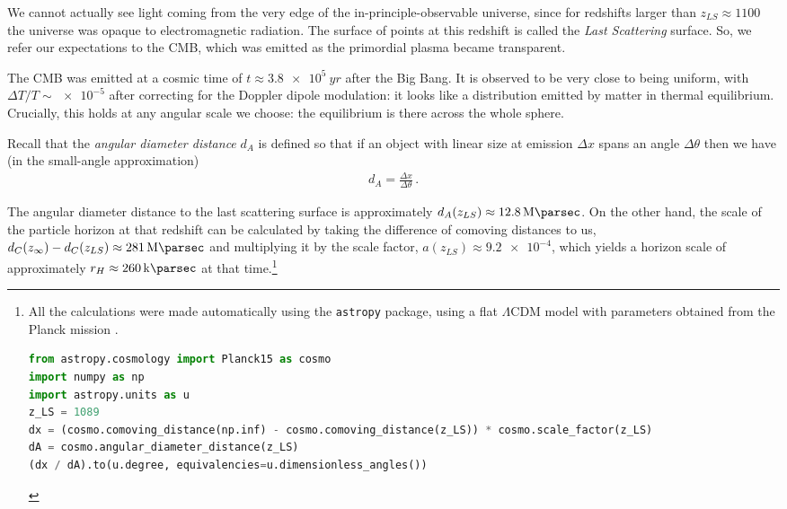 \documentclass[main.tex]{subfiles}
\begin{document}
We cannot actually see light coming from the very edge of the in-principle-observable universe, since for redshifts larger than \(z _{LS} \approx 1100\) the universe was opaque to electromagnetic radiation. The surface of points at this redshift is called the \emph{Last Scattering} surface. So, we refer our expectations to the CMB, which was emitted as the primordial plasma became transparent. 






The CMB was emitted at a cosmic time of \(t \approx \SI{3.8e5}{yr}\) after the Big Bang.
It is observed to be very close to being uniform, with \(\Delta T / T \sim \num{e-5}\) after correcting for the Doppler dipole modulation: 
it looks like a distribution emitted by matter in thermal equilibrium.
Crucially, this holds at any angular scale we choose: the equilibrium is there across the whole sphere.

Recall that the \emph{angular diameter distance} \(d_A\) is defined so that if an object with linear size at emission \(\Delta x\) spans an angle \(\Delta \theta \) then we have (in the small-angle approximation) 
%
\begin{align}
d_A = \frac{\Delta x}{\Delta \theta }
\,.
\end{align}

The angular diameter distance to the last scattering surface  is approximately \(d_A (z_{LS}) \approx \SI{12.8}{\mega\parsec}\).
On the other hand, the scale of the particle horizon at that redshift can be calculated by taking the difference of comoving distances to us, \( d_C(z_\infty) - d_C(z_{LS}) \approx \SI{281}{\mega\parsec}\) and multiplying it by the scale factor, \(a(z_{LS}) \approx \num{9.2e-4}\), which yields a horizon scale of approximately \(r_H \approx \SI{260}{\kilo\parsec}\) at that time.\cprotect\footnote{All the calculations were made automatically using the \texttt{astropy} package, using a flat \(\Lambda \)CDM model with parameters obtained from the Planck mission \cite[]{PlanckCollaboration:2016XIII}.
\begin{lstlisting}[language=Python]
from astropy.cosmology import Planck15 as cosmo
import numpy as np
import astropy.units as u
z_LS = 1089
dx = (cosmo.comoving_distance(np.inf) - cosmo.comoving_distance(z_LS)) * cosmo.scale_factor(z_LS)
dA = cosmo.angular_diameter_distance(z_LS)
(dx / dA).to(u.degree, equivalencies=u.dimensionless_angles())
\end{lstlisting}}
\end{document}
